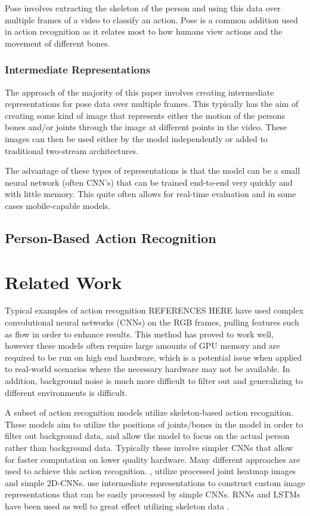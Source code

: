 \documentclass[10pt,twocolumn,letterpaper]{article}
\begin{document}
Pose involves extracting the skeleton of the person and using this data over multiple frames of a video to classify an action. Pose is a common addition used in action recognition as it relates most to how humans view actions and the movement of different bones.

\subsubsection{Intermediate Representations}

The approach of the majority of this paper involves creating intermediate representations for pose data over multiple frames. This typically has the aim of creating some kind of image that represents either the motion of the persons bones and/or joints through the image at different points in the video. These images can then be used either by the model independently or added to traditional two-stream architectures.

The advantage of these types of representations is that the model can be a small neural network (often CNN's) that can be trained end-to-end very quickly and with little memory. This quite often allows for real-time evaluation and in some cases mobile-capable models.

\subsection{Person-Based Action Recognition}

\section{Related Work}
\label{sec:relatedwork}

 Typical examples of action recognition REFERENCES HERE have used complex convolutional neural networks (CNNs) on the RGB frames, pulling features such as flow in order to enhance results. This method has proved to work well, however these models often require large amounts of GPU memory and are required to be run on high end hardware, which is a potential issue when applied to real-world scenarios where the necessary hardware may not be available. In addition, background noise is much more difficult to filter out and generalizing to different environments is difficult.
 
 A subset of action recognition models utilize skeleton-based action recognition. These models aim to utilize the positions of joints/bones in the model in order to filter out background data, and allow the model to focus on the actual person rather than background data. Typically these involve simpler CNNs that allow for faster computation on lower quality hardware. Many different approaches are used to achieve this action recognition. \cite{potion}, \cite{PA3D} utilize processed joint heatmap images and simple 2D-CNNs. \cite{simple_yet_efficient} \cite{smaller_faster_better} use intermediate representations to construct custom image representations that can be easily processed by simple CNNs. RNNs and LSTMs have been used as well to great effect utilizing skeleton data \cite{two_branch_stacked_lstm} \cite{RNN_joint_relative_motion} \cite{RNN_occlusion} \cite{DS_lstm}.
\end{document}

